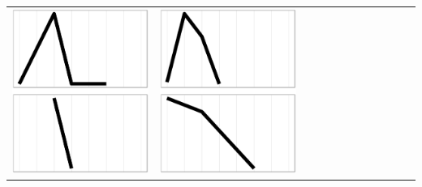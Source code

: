 \documentclass[10pt, conference, compsocconf]{IEEEtran}
\begin{document}
\begin{table}
\begin{tabular}{ | b{1.5cm} | c | c | c | c | c | c | c | c | c | c | c |}
 \includegraphics[scale=0.08]{figures/bcbb.ps} &  
 \includegraphics[scale=0.08]{figures/ccaa.ps} &  

\end{tabular}
\end{table}
\end{document}
